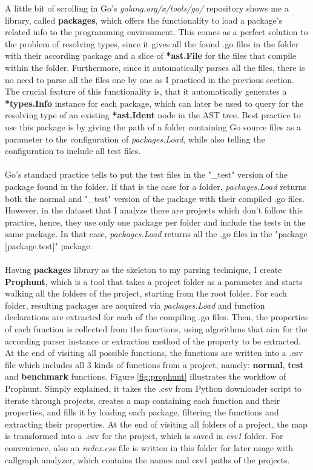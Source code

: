 \documentclass{seal_thesis}
\begin{document}
A little bit of scrolling in Go's \textit{golang.org/x/tools/go/} repository shows me a library, called \textbf{packages}\cite{packages}, which offers the functionality to load a package's related info to the programming environment. This comes as a perfect solution to the problem of resolving types, since it gives all the found .go files in the folder with their according package and a slice of \textbf{*ast.File} for the files that compile within the folder. Furthermore, since it automatically parses all the files, there is no need to parse all the files one by one as I practiced in the previous section. The crucial feature of this functionality is, that it automatically generates a \textbf{*types.Info} instance for each package, which can later be used to query for the resolving type of an existing \textbf{*ast.Ident} node in the AST tree. Best practice to use this package is by giving the path of a folder containing Go source files as a parameter to the configuration of \textit{packages.Load}, while also telling the configuration to include all test files.\\
\\
Go's standard practice tells to put the test files in the "\_test" version of the package found in the folder. If that is the case for a folder, \textit{packages.Load} returns both the normal and "\_test" version of the package with their compiled .go files. However, in the dataset that I analyze there are projects which don't follow this practice, hence, they use only one package per folder and include the tests in the same package. In that case, \textit{packages.Load} returns all the .go files in the "package [package.test]" package.\\
\\
Having \textbf{packages} library as the skeleton to my parsing technique, I create \textbf{Prophunt}, which is a tool that takes a project folder as a parameter and starts walking all the folders of the project, starting from the root folder. For each folder, resulting packages are acquired via \textit{packages.Load} and function declarations are extracted for each of the compiling .go files. Then, the properties of each function is collected from the functions, using algorithms that aim for the according parser instance or extraction method of the property to be extracted. At the end of visiting all possible functions, the functions are written into a .csv file which includes all 3 kinds of functions from a project, namely: \textbf{normal}, \textbf{test} and \textbf{benchmark} functions. Figure \ref{fig:prophunt} illustrates the workflow of Prophunt. Simply explained, it takes the .csv from Python downloader script to iterate through projects, creates a map containing each function and their properties, and fills it by loading each package, filtering the functions and extracting their properties. At the end of visiting all folders of a project, the map is transformed into a .csv for the project, which is saved in \textit{csv1} folder. For convenience, also an \textit{index.csv} file is written in this folder for later usage with callgraph analyzer, which contains the names and csv1 paths of the projects.
\end{document}
